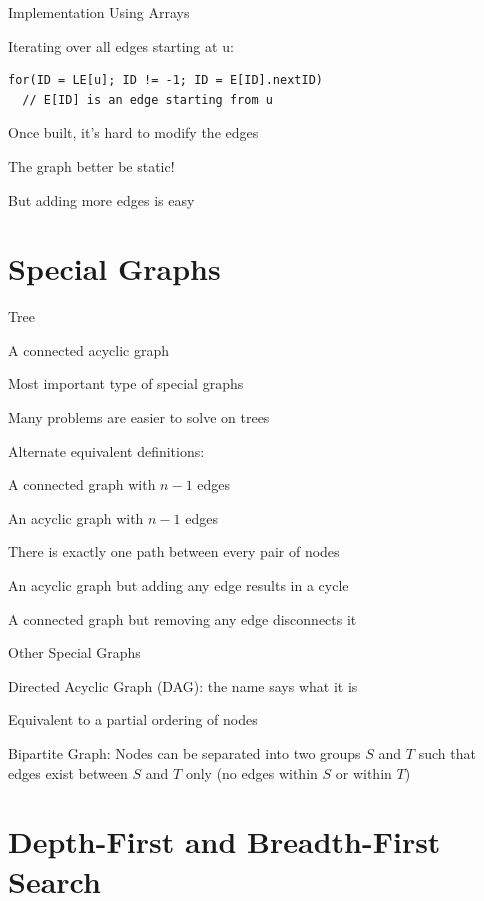 \documentclass[13pt,onlymath]{beamer}
\begin{document}
\begin{frame}[fragile]{Implementation Using Arrays}
\BIT
\item Iterating over all edges starting at u:
\begin{Verbatim}[xleftmargin=15pt]
for(ID = LE[u]; ID != -1; ID = E[ID].nextID)
  // E[ID] is an edge starting from u
\end{Verbatim}
\vfill
\item Once built, it's hard to modify the edges
\BIT
\item The graph better be static!
\item But adding more edges is easy
\EIT
\EIT
\end{frame}

\section{Special Graphs}
\begin{frame}{Tree}
\BIT
\item A connected acyclic graph
\item Most important type of special graphs
\BIT
\item Many problems are easier to solve on trees
\EIT
\item Alternate equivalent definitions:
\BIT
\item A connected graph with $n-1$ edges
\item An acyclic graph with $n-1$ edges
\item There is exactly one path between every pair of nodes
\item An acyclic graph but adding any edge results in a cycle
\item A connected graph but removing any edge disconnects it
\EIT
\EIT
\end{frame}

\begin{frame}{Other Special Graphs}
\BIT
\item Directed Acyclic Graph (DAG): the name says what it is
\BIT
\item Equivalent to a partial ordering of nodes
\EIT
\vfill
\item Bipartite Graph: Nodes can be separated into two groups $S$ and $T$ such that edges exist between $S$ and $T$ only (no edges within $S$ or within $T$)
\EIT
\end{frame}

\section{Depth-First and Breadth-First Search}
\end{document}

